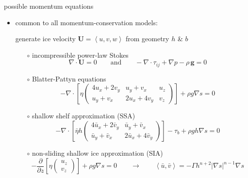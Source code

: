\documentclass{beamer}
\newcommand\bU{\mathbf{U}}
\newcommand\Div{\nabla\cdot}
\newcommand\grad{\nabla}
\newcommand{\ip}[2]{\ensuremath{\left<#1,#2\right>}}
\begin{document}
\begin{frame}{possible momentum equations}

\begin{itemize}
\item common to all momentum-conservation models:
\begin{center}
\alert{generate ice velocity $\bU=\left<u,v,w\right>$ from geometry $h$ \& $b$}
\end{center}

  \begin{itemize}
  \footnotesize
  \item[$\circ$] incompressible power-law Stokes
\begin{equation*}
  \nabla \cdot \bU = 0 \qquad \text{and} \qquad - \nabla \cdot \tau_{ij} + \nabla p - \rho\, \mathbf{g} = 0
\end{equation*}
  \item[$\circ$] Blatter-Pattyn equations
$$-\Div \left[\eta \begin{pmatrix}
4 u_x+2v_y & u_y+v_x   & u_z \\
u_y+v_x    & 2u_x+4v_y & v_z
\end{pmatrix} \right] + \rho g \grad s = 0$$
  \item[$\circ$] shallow shelf approximation (SSA)
$$-\Div \left[\bar \eta h \begin{pmatrix}
4 \bar u_x+2\bar v_y & \bar u_y+\bar v_x   \\
\bar u_y+\bar v_x    & 2\bar u_x+4\bar v_y
\end{pmatrix} \right] - \tau_b + \rho g h \grad s = 0$$
  \item[$\circ$] non-sliding shallow ice approximation (SIA)
$$-\frac{\partial}{\partial z} \left[\eta \begin{pmatrix}
u_z \\
v_z
\end{pmatrix} \right] + \rho g \grad s = 0
\qquad \to \qquad
\ip{\bar u}{\bar v} = -\Gamma h^{n+2} |\grad s|^{n-1} \grad s$$
  \end{itemize}
\end{itemize}
\end{frame}
\end{document}
